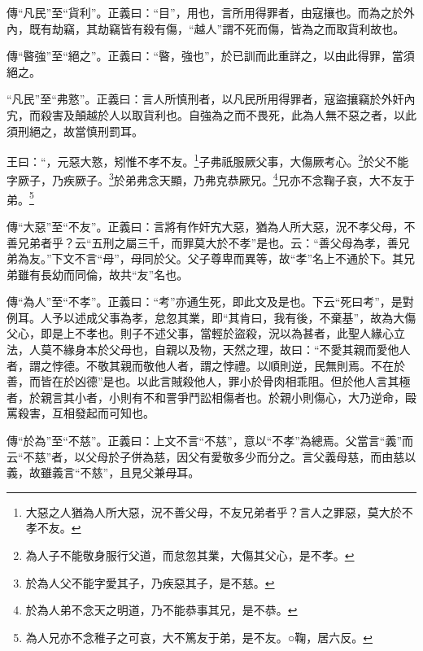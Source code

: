 {\noindent\zhuan{}\fzbyks 傳“凡民”至“貨利”。正義曰：“目”，用也，言所用得罪者，由寇攘也。而為之於外內，既有劫竊，其劫竊皆有殺有傷，“越人”謂不死而傷，皆為之而取貨利故也。 \par}

{\noindent\zhuan{}\fzbyks 傳“暋強”至“絕之”。正義曰：“暋，強也”，於已訓而此重詳之，以由此得罪，當須絕之。 \par}

{\noindent\shu{}\fzkt “凡民”至“弗憝”。正義曰：言人所慎刑者，以凡民所用得罪者，寇盜攘竊於外奸內宄，而殺害及顛越於人以取貨利也。自強為之而不畏死，此為人無不惡之者，以此須刑絕之，故當慎刑罰耳。 \par}

王曰：“，元惡大憝，矧惟不孝不友。\footnote{大惡之人猶為人所大惡，況不善父母，不友兄弟者乎？言人之罪惡，莫大於不孝不友。}子弗祇服厥父事，大傷厥考心。\footnote{為人子不能敬身服行父道，而怠忽其業，大傷其父心，是不孝。}於父不能字厥子，乃疾厥子。\footnote{於為人父不能字愛其子，乃疾惡其子，是不慈。}於弟弗念天顯，乃弗克恭厥兄。\footnote{於為人弟不念天之明道，乃不能恭事其兄，是不恭。}兄亦不念鞠子哀，大不友于弟。\footnote{為人兄亦不念稚子之可哀，大不篤友于弟，是不友。○鞠，居六反。}


{\noindent\zhuan{}\fzbyks 傳“大惡”至“不友”。正義曰：言將有作奸宄大惡，猶為人所大惡，況不孝父母，不善兄弟者乎？云“五刑之屬三千，而罪莫大於不孝”是也。云：“善父母為孝，善兄弟為友。”下文不言“母”，母同於父。父子尊卑而異等，故“孝”名上不通於下。其兄弟雖有長幼而同倫，故共“友”名也。 \par}

{\noindent\zhuan{}\fzbyks 傳“為人”至“不孝”。正義曰：“考”亦通生死，即此文及是也。下云“死曰考”，是對例耳。人予以述成父事為孝，怠忽其業，即“其肯曰，我有後，不棄基”，故為大傷父心，即是上不孝也。則子不述父事，當輕於盜殺，況以為甚者，此聖人緣心立法，人莫不緣身本於父母也，自親以及物，天然之理，故曰：“不愛其親而愛他人者，謂之悖德。不敬其親而敬他人者，謂之悖禮。以順則逆，民無則焉。不在於善，而皆在於凶德”是也。以此言賊殺他人，罪小於骨肉相乖阻。但於他人言其極者，於親言其小者，小則有不和詈爭鬥訟相傷者也。於親小則傷心，大乃逆命，毆罵殺害，互相發起而可知也。 \par}

{\noindent\zhuan{}\fzbyks 傳“於為”至“不慈”。正義曰：上文不言“不慈”，意以“不孝”為總焉。父當言“義”而云“不慈”者，以父母於子併為慈，因父有愛敬多少而分之。言父義母慈，而由慈以義，故雖義言“不慈”，且見父兼母耳。 \par}

